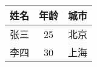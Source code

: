 \documentclass[crop,dvisvgm]{standalone}
\begin{document}
  \begin {tabular}{|l|c|r|}
    \hline 
    姓名 & 年龄 & 城市 \\
    \hline 
    张三 & 25 & 北京 \\
    李四 & 30 & 上海 \\
    \hline 
  \end {tabular}
\end{document}
